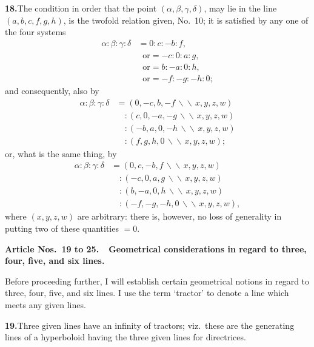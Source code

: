 \documentclass[11pt,a4paper]{article}
\begin{document}
\textbf{18.}\quad The condition in order that the point
$(\alpha, \beta, \gamma, \delta)$, may lie in the line $(a, b, c, f, g, h)$, is
the twofold relation given, No.~10; it is satisfied by any one of the four
systems
\begin{align*}
\alpha : \beta : \gamma : \delta &= 0 : c : -b : f, \\
   &\;\;\text{or} = -c : 0 : a : g, \\
   &\;\;\text{or} = b : -a : 0 : h, \\
   &\;\;\text{or} = -f : -g : -h : 0;
\end{align*}
and consequently, also by
\begin{align*}
\alpha : \beta : \gamma : \delta
   &= (0, -c, b, -f \,\backslash\!\!\backslash\, x, y, z, w) \\
   &\quad : (c, 0, -a, -g \,\backslash\!\!\backslash\, x, y, z, w) \\
   &\quad : (-b, a, 0, -h \,\backslash\!\!\backslash\, x, y, z, w) \\
   &\quad : (f, g, h, 0 \,\backslash\!\!\backslash\, x, y, z, w);
\end{align*}
or, what is the same thing, by
\begin{align*}
\alpha : \beta : \gamma : \delta
   &= (0, c, -b, f \,\backslash\!\!\backslash\, x, y, z, w) \\
   &\quad : (-c, 0, a, g \,\backslash\!\!\backslash\, x, y, z, w) \\
   &\quad : (b, -a, 0, h \,\backslash\!\!\backslash\, x, y, z, w) \\
   &\quad : (-f, -g, -h, 0 \,\backslash\!\!\backslash\, x, y, z, w),
\end{align*}
where $(x, y, z, w)$ are arbitrary: there is, however, no loss of generality in
putting two of these quantities $= 0$.

\medskip
\noindent\textbf{Article Nos.~19 to 25.\ \ Geometrical considerations in regard
to three, four, five, and six lines.}
\medskip

Before proceeding further, I will establish certain geometrical notions in
regard to three, four, five, and six lines. I use the term `tractor' to denote
a line which meets any given lines.

\textbf{19.}\quad Three given lines have an infinity of tractors; viz.\ these
are the generating lines of a hyperboloid having the three given lines for
directrices.

\end{document}
